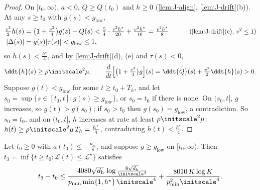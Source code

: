 \begin{proof}
On $[t_0,\infty)$, $a<0$, $Q\ge Q(t_0)$ and $h\ge0$ (\cref{lem:J-align}, \cref{lem:J-drift}(b)). At any $s\ge t_0$ with $g(s)<g_{\mathrm{low}}$,
\begin{alignat*}{2}
 \tfrac{v^2}{2}h(s)&=\bigl(1+\tfrac{v^2}{4}\bigr)g(s)-Q(s)<\tfrac{5}{4}\cdot\tfrac{v^2h^\star}{20}+\tfrac{v^2h^\star}{16}=\tfrac{v^2h^\star}{8} &\qquad& \why{\cref{lem:J-drift}(c), $v^2\le1$}\\
 |\Delta(s)|&=g(s)|\tau(s)|<g_{\mathrm{low}}\le1,
\end{alignat*}
so $h(s)<\frac{h^\star}{4}$, and by \cref{lem:J-drift}(d), (e) and $\tau(s)<0$,
\[
 \ddt{h}(s)\ge\rho\initscale^2\mu,\qquad \frac{d}{dt}\Bigl[\bigl(1+\tfrac{v^2}{4}\bigr)g\Bigr](s)=\ddt{Q}(s)+\tfrac{v^2}{2}\ddt{h}(s)>0 .
\]
Suppose $g(t)<g_{\mathrm{low}}$ for some $t\ge t_0+T_h$, and let $s_0=\sup\{s\in[t_0,t]:g(s)\ge g_{\mathrm{low}}\}$, or $s_0=t_0$ if there is none. On $(s_0,t]$, $g$
increases, so $g(t)>g(s_0)$; if $s_0>t_0$ then $g(s_0)=g_{\mathrm{low}}$, a contradiction. So $s_0=t_0$, and on $(t_0,t]$, $h$ increases at rate at least
$\rho\initscale^2\mu$: $h(t)\ge\rho\initscale^2\mu\,T_h=\frac{h^\star}{4}$, contradicting $h(t)<\frac{h^\star}{4}$.
\end{proof}

\begin{lemma}
\label{lem:J-grow}
Let $t_0\ge0$ with $a(t_0)\le-\frac{a_{\mathrm{sc}}}{8}$, and suppose $g\ge g_{\mathrm{low}}$ on $[t_0,\infty)$. Then $t_3=\inf\{t\ge t_0:\mathcal L(t)\le\mathcal L^\star\}$ satisfies
\[
 t_3-t_0\le\frac{4080\sqrt{d_{\mathrm h}}\,\log\frac{8\sqrt{d_{\mathrm h}}}{\initscale^4}}{p_{\min}\min\{1,h^\star\}\,\initscale^4}+\frac{8010\,K\log K}{p_{\min}^2\initscale^4} .
\]
\end{lemma}

